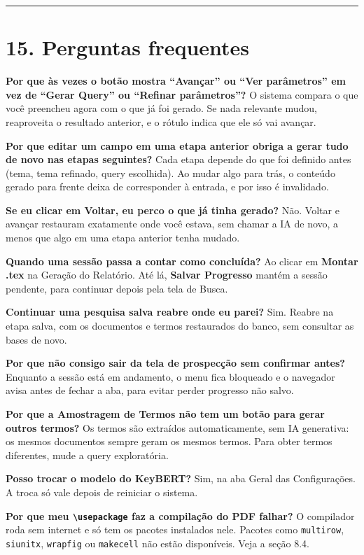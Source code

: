\documentclass[
  brazilian,
  a4paper,12pt,oneside]{report}
\begin{document}
\begin{center}\rule{0.5\linewidth}{0.5pt}\end{center}

\chapter{15. Perguntas frequentes}\label{perguntas-frequentes}

\textbf{Por que às vezes o botão mostra ``Avançar'' ou ``Ver
parâmetros'' em vez de ``Gerar Query'' ou ``Refinar parâmetros''?} O
sistema compara o que você preencheu agora com o que já foi gerado. Se
nada relevante mudou, reaproveita o resultado anterior, e o rótulo
indica que ele só vai avançar.

\textbf{Por que editar um campo em uma etapa anterior obriga a gerar
tudo de novo nas etapas seguintes?} Cada etapa depende do que foi
definido antes (tema, tema refinado, query escolhida). Ao mudar algo
para trás, o conteúdo gerado para frente deixa de corresponder à
entrada, e por isso é invalidado.

\textbf{Se eu clicar em Voltar, eu perco o que já tinha gerado?} Não.
Voltar e avançar restauram exatamente onde você estava, sem chamar a IA
de novo, a menos que algo em uma etapa anterior tenha mudado.

\textbf{Quando uma sessão passa a contar como concluída?} Ao clicar em
\textbf{Montar .tex} na Geração do Relatório. Até lá, \textbf{Salvar
Progresso} mantém a sessão pendente, para continuar depois pela tela de
Busca.

\textbf{Continuar uma pesquisa salva reabre onde eu parei?} Sim. Reabre
na etapa salva, com os documentos e termos restaurados do banco, sem
consultar as bases de novo.

\textbf{Por que não consigo sair da tela de prospecção sem confirmar
antes?} Enquanto a sessão está em andamento, o menu fica bloqueado e o
navegador avisa antes de fechar a aba, para evitar perder progresso não
salvo.

\textbf{Por que a Amostragem de Termos não tem um botão para gerar
outros termos?} Os termos são extraídos automaticamente, sem IA
generativa: os mesmos documentos sempre geram os mesmos termos. Para
obter termos diferentes, mude a query exploratória.

\textbf{Posso trocar o modelo do KeyBERT?} Sim, na aba Geral das
Configurações. A troca só vale depois de reiniciar o sistema.

\textbf{Por que meu \texttt{\textbackslash{}usepackage} faz a compilação
do PDF falhar?} O compilador roda sem internet e só tem os pacotes
instalados nele. Pacotes como \texttt{multirow}, \texttt{siunitx},
\texttt{wrapfig} ou \texttt{makecell} não estão disponíveis. Veja a
seção 8.4.
\end{document}
